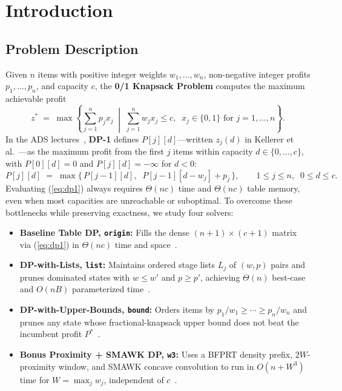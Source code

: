 \documentclass[10pt, a4paper]{article}
\newcommand{\code}[1]{\texttt{\color{primary!90!black}#1}}
\begin{document}
\section{Introduction}

\subsection{Problem Description}
Given $n$ items with positive integer weights $w_1, \ldots, w_n$, non-negative integer profits $p_1, \ldots, p_n$, and capacity $c$, the \textbf{0/1 Knapsack Problem} computes the maximum achievable profit
\begin{equation}
  z^* \;=\; \max \left\{ \sum_{j=1}^{n} p_j x_j \;\middle|\; \sum_{j=1}^{n} w_j x_j \le c,\;\; x_j \in \{0, 1\} \text{ for } j = 1, \ldots, n \right\}.
  \label{eq:kp}
\end{equation}
In the ADS lectures~\cite{ads_slides2026}, \textbf{DP-1} defines $P[j][d]$---written $z_j(d)$ in Kellerer et al.~\cite{kellerer2004knapsack}---as the maximum profit from the first $j$ items within capacity $d \in \{0, \ldots, c\}$, with $P[0][d] = 0$ and $P[j][d] = -\infty$ for $d < 0$:
\begin{equation}
  P[j][d] \;=\; \max\bigl\{\, P[j-1][d],\;\; P[j-1][d - w_j] + p_j \,\bigr\}, \qquad 1 \le j \le n,\;\; 0 \le d \le c.
  \label{eq:dp1}
\end{equation}
Evaluating (\ref{eq:dp1}) always requires $\Theta(nc)$ time and $\Theta(nc)$ table memory, even when most capacities are unreachable or suboptimal. To overcome these bottlenecks while preserving exactness, we study four solvers:
\begin{itemize}
  \item \textbf{\color{primary}Baseline Table DP, \code{origin}:} Fills the dense $(n+1) \times (c+1)$ matrix via (\ref{eq:dp1}) in $\Theta(nc)$ time and space~\cite{ads_slides2026}.
  \item \textbf{\color{primary}DP-with-Lists, \code{list}:} Maintains ordered stage lists $L_j$ of $(w, p)$ pairs and prunes dominated states with $w \le w'$ and $p \ge p'$, achieving $\Theta(n)$ best-case and $O(nB)$ parameterized time~\cite{kellerer2004knapsack}.
  \item \textbf{\color{primary}DP-with-Upper-Bounds, \code{bound}:} Orders items by $p_1/w_1 \ge \cdots \ge p_n/w_n$ and prunes any state whose fractional-knapsack upper bound does not beat the incumbent profit $P^*$~\cite{kellerer2004knapsack}.
  \item \textbf{\color{primary}Bonus Proximity + SMAWK DP, \code{w3}:} Uses a BFPRT density prefix, $2W$-proximity window, and SMAWK concave convolution to run in $O(n + W^3)$ time for $W = \max_j w_j$, independent of $c$~\cite{polak2021knapsack}.
\end{itemize}
\end{document}
